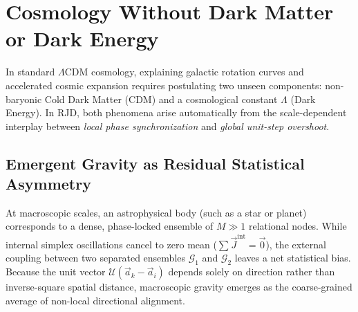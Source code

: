 \documentclass[11pt,a4paper]{article}
\theoremstyle{plain}
\theoremstyle{definition}
\theoremstyle{remark}
\newcommand{\Jerk}{\vec{J}}
\newcommand{\Acc}{\vec{a}}
\begin{document}
\section{Cosmology Without Dark Matter or Dark Energy}
\label{sec:cosmology}
In standard $\Lambda$CDM cosmology, explaining galactic rotation curves and accelerated cosmic expansion requires postulating two unseen components: non-baryonic Cold Dark Matter (CDM) and a cosmological constant $\Lambda$ (Dark Energy). In RJD, both phenomena arise automatically from the scale-dependent interplay between \emph{local phase synchronization} and \emph{global unit-step overshoot}.
\subsection{Emergent Gravity as Residual Statistical Asymmetry}
At macroscopic scales, an astrophysical body (such as a star or planet) corresponds to a dense, phase-locked ensemble of $M \gg 1$ relational nodes. While internal simplex oscillations cancel to zero mean ($\sum \Jerk^{\mathrm{int}} = \vec{0}$), the external coupling between two separated ensembles $\mathcal{G}_1$ and $\mathcal{G}_2$ leaves a net statistical bias. Because the unit vector $\mathcal{U}(\Acc_k - \Acc_i)$ depends solely on direction rather than inverse-square spatial distance, macroscopic gravity emerges as the coarse-grained average of non-local directional alignment.
\end{document}
